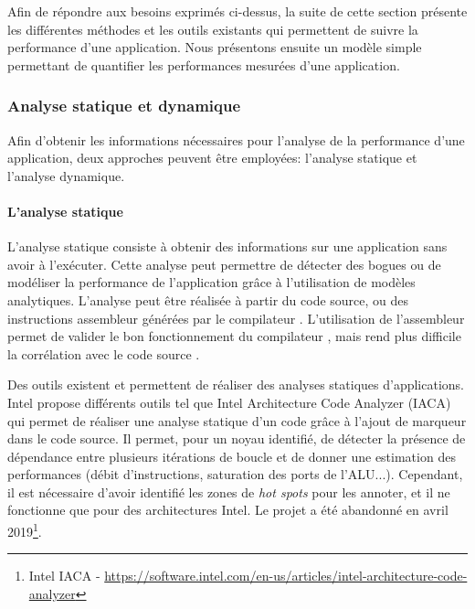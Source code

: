          Afin de répondre aux besoins exprimés ci-dessus, la suite de cette section présente les différentes méthodes et les outils existants qui permettent de suivre la performance d'une application. Nous présentons ensuite un modèle simple permettant de quantifier les performances mesurées d'une application.
           
      
 
    \subsubsection{Analyse statique et dynamique}
        
        Afin d'obtenir les informations nécessaires pour l'analyse de la performance d'une application, deux approches peuvent être employées: l'analyse statique et l'analyse dynamique.
        
        \paragraph{L'analyse statique}
            
            L’analyse statique consiste à obtenir des informations sur une application sans avoir à l'exécuter. Cette analyse peut permettre de détecter des bogues \cite{Lattner2016} ou de modéliser la performance de l'application grâce à l'utilisation de modèles analytiques. L'analyse peut être réalisée à partir du code source, ou des instructions assembleur générées par le compilateur \cite{Djoudi2005, wong2015vp3}. L'utilisation de l'assembleur permet de valider le bon fonctionnement du compilateur \cite{charif2014cqa}, mais rend plus difficile la corrélation avec le code source \cite{de2010new}.
            
            Des outils existent et permettent de réaliser des analyses statiques d'applications. 
            Intel propose différents outils tel que Intel Architecture Code Analyzer (IACA) \cite{Hirsh2012} qui permet de réaliser une analyse statique d'un code grâce à l'ajout de marqueur dans le code source. Il permet, pour un noyau identifié, de détecter la présence de dépendance entre plusieurs itérations de boucle et de donner une estimation des performances (débit d'instructions, saturation des ports de l'ALU...). Cependant, il est nécessaire d'avoir identifié les zones de \textit{hot spots} pour les annoter, et il ne fonctionne que pour des architectures Intel. Le projet a été abandonné en avril 2019\footnote{Intel IACA - \url{https://software.intel.com/en-us/articles/intel-architecture-code-analyzer}}.
        

